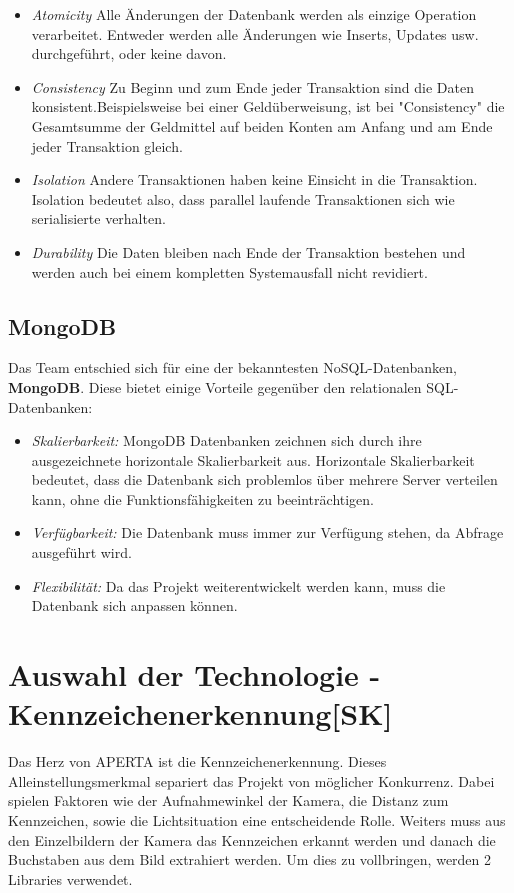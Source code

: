 \begin{itemize}
  \item \textit{Atomicity}
  \subitem Alle Änderungen der Datenbank werden als einzige Operation verarbeitet. Entweder werden alle Änderungen wie Inserts, Updates usw. durchgeführt, oder keine davon.
  \item \textit{Consistency}
  \subitem Zu Beginn und zum Ende jeder Transaktion sind die Daten konsistent.Beispielsweise bei einer Geldüberweisung, ist bei "Consistency" die Gesamtsumme der Geldmittel auf beiden Konten am Anfang und am Ende jeder Transaktion gleich.
  \item \textit{Isolation}
  \subitem Andere Transaktionen haben keine Einsicht in die Transaktion. Isolation bedeutet also, dass parallel laufende Transaktionen sich wie serialisierte verhalten.
  \item \textit{Durability}
  \subitem Die Daten bleiben nach Ende der Transaktion bestehen und werden auch bei einem kompletten Systemausfall nicht revidiert.
\end{itemize}
\cite{ACID}

\subsection{MongoDB}
Das Team entschied sich für eine der bekanntesten NoSQL-Datenbanken, \textbf{MongoDB}. Diese bietet einige Vorteile gegenüber den relationalen SQL-Datenbanken:

\begin{itemize}
  \item \textit{Skalierbarkeit: } MongoDB Datenbanken zeichnen sich durch ihre ausgezeichnete horizontale Skalierbarkeit aus. Horizontale Skalierbarkeit bedeutet, dass die Datenbank sich problemlos über mehrere Server verteilen kann, ohne die Funktionsfähigkeiten zu beeinträchtigen.
  \item \textit{Verfügbarkeit: } Die Datenbank muss immer zur Verfügung stehen, da  Abfrage ausgeführt wird.
  \item \textit{Flexibilität: } Da das Projekt weiterentwickelt werden kann, muss die Datenbank sich anpassen können.
\end{itemize}
\cite{VorteileMongoDB}
\section{Auswahl der Technologie - Kennzeichenerkennung[SK]}
Das Herz von APERTA ist die Kennzeichenerkennung. Dieses Alleinstellungsmerkmal separiert das Projekt von möglicher Konkurrenz. Dabei spielen Faktoren wie der Aufnahmewinkel der Kamera, die Distanz zum Kennzeichen, sowie die Lichtsituation eine entscheidende Rolle. Weiters muss aus den Einzelbildern der Kamera das Kennzeichen erkannt werden und danach die Buchstaben aus dem Bild extrahiert werden. Um dies zu vollbringen, werden 2 Libraries verwendet.
